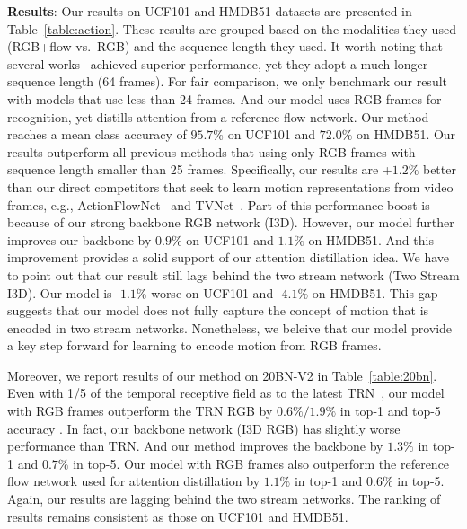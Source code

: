 \documentclass[10pt,twocolumn,letterpaper]{article}
\begin{document}
\noindent \textbf{Results}: Our results on UCF101 and HMDB51 datasets are presented in Table~\ref{table:action}. These results are grouped based on the modalities they used (RGB+flow vs.\ RGB) and the sequence length they used. It worth noting that several works~\cite{carreira2017quo,Xie_2018_ECCV} achieved superior performance, yet they adopt a much longer sequence length (64 frames). For fair comparison, we only benchmark our result with models that use less than 24 frames. And our model uses RGB frames for recognition, yet distills attention from a reference flow network. Our method reaches a mean class accuracy of $95.7\%$ on UCF101 and $72.0\%$ on HMDB51. Our results outperform all previous methods that using only RGB frames with sequence length smaller than 25 frames.  Specifically, our results are +$1.2\%$ better than our direct competitors that seek to learn motion representations from video frames, e.g., ActionFlowNet~\cite{ng2016actionflownet} and TVNet~\cite{fan2018end}. Part of this performance boost is because of our strong backbone RGB network (I3D). However, our model further improves our backbone by $0.9\%$ on UCF101 and $1.1\%$ on HMDB51. And this improvement provides a solid support of our attention distillation idea. We have to point out that our result still lags behind the two stream network (Two Stream I3D). Our model is -$1.1\%$ worse on UCF101 and -$4.1\%$ on HMDB51. This gap suggests that our model does not fully capture the concept of motion that is encoded in two stream networks. Nonetheless, we beleive that our model provide a key step forward for learning to encode motion from RGB frames. 

Moreover, we report results of our method on 20BN-V2 in Table~\ref{table:20bn}. Even with 1/5 of the temporal receptive field as to the latest TRN~\cite{zhou2017temporal}, our model with RGB frames outperform the TRN RGB by $0.6\%/1.9\%$ in top-1 and top-5 accuracy . In fact, our backbone network (I3D RGB) has slightly worse performance than TRN. And our method improves the backbone by $1.3\%$ in top-1 and $0.7\%$ in top-5. Our model with RGB frames also outperform the reference flow network used for attention distillation by $1.1\%$ in top-1 and $0.6\%$ in top-5. Again, our results are lagging behind the two stream networks. The ranking of results remains consistent as those on UCF101 and HMDB51.
\end{document}
